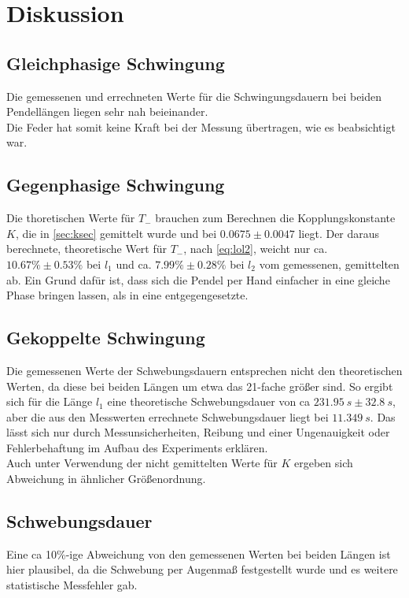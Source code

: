 \section{Diskussion}
\label{sec:Diskussion}

\subsection{Gleichphasige Schwingung}
Die gemessenen und errechneten Werte für die Schwingungsdauern bei beiden Pendellängen liegen sehr nah beieinander.\\
Die Feder hat somit keine Kraft bei der Messung übertragen, wie es beabsichtigt war.
\subsection{Gegenphasige Schwingung}
Die thoretischen Werte für $T_-$ brauchen zum Berechnen die Kopplungskonstante $K$, die in \autoref{sec:ksec} gemittelt wurde und bei $0.0675\pm 0.0047$ liegt.
Der daraus berechnete, theoretische Wert für $T_-$, nach \autoref{eq:lol2}, weicht nur ca. $10.67\%\pm 0.53\%$ bei $l_1$ und ca. $7.99\%\pm 0.28\%$ bei $l_2$ vom gemessenen, gemittelten ab.
Ein Grund dafür ist, dass sich die Pendel per Hand einfacher in eine gleiche Phase bringen lassen, als in eine entgegengesetzte.
\subsection{Gekoppelte Schwingung}
Die gemessenen Werte der Schwebungsdauern entsprechen nicht den theoretischen Werten, da diese bei beiden Längen um etwa das 21-fache größer sind.
So ergibt sich für die Länge $l_1$ eine theoretische Schwebungsdauer von ca $231.95\ s\pm 32.8\ s$, aber die aus den Messwerten errechnete Schwebungsdauer liegt bei $11.349\ s$. 
Das lässt sich nur durch Messunsicherheiten, Reibung und einer Ungenauigkeit oder Fehlerbehaftung im Aufbau des Experiments erklären.\\
Auch unter Verwendung der nicht gemittelten Werte für $K$ ergeben sich Abweichung in ähnlicher Größenordnung.
\subsection{Schwebungsdauer}
Eine ca 10\%-ige Abweichung von den gemessenen Werten bei beiden Längen ist hier plausibel, da die Schwebung per Augenmaß festgestellt wurde und es weitere statistische Messfehler gab.